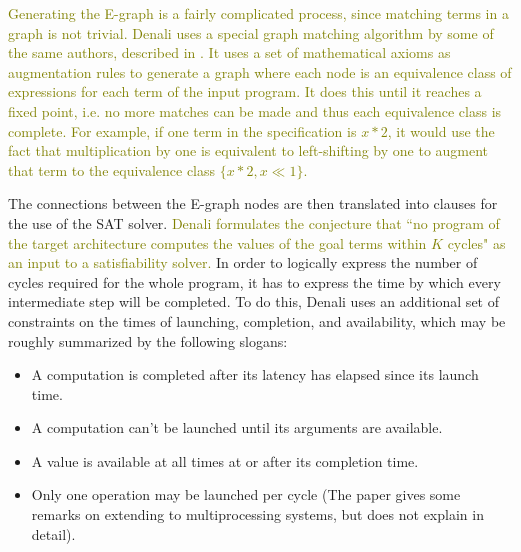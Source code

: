 \documentclass[12pt,twoside]{reedthesis}
\newcommand{\green}[1]{\textcolor{olive}{#1}}
\begin{document}
            \green{
            Generating the E-graph is a fairly complicated process, since matching terms in a graph is not trivial.
            Denali uses a special graph matching algorithm by some of the same authors, described in \cite{detlefs2005simplify}.
            It uses a set of mathematical axioms as augmentation rules to generate a graph where each node is an equivalence class of expressions for each term of the input program. It does this until it reaches a fixed point, i.e. no more matches can be made and thus each equivalence class is complete.
            For example, if one term in the specification is $x * 2$, it would use the fact that multiplication by one is equivalent to left-shifting by one to augment that term to the equivalence class $\{x * 2, x \ll 1\}$.
            }
            
                
            The connections between the E-graph nodes are then translated into clauses for the use of the SAT solver.
            \green{
            Denali formulates the conjecture that ``no program of the target architecture computes the values of the goal terms within $K$ cycles" as an input to a satisfiability solver.
            }
            In order to logically express the number of cycles required for the whole program, it has to express the time by which every intermediate step will be completed.
            To do this, Denali uses an additional set of constraints on the times of launching, completion, and availability, which may be roughly summarized by the following slogans:
            \begin{itemize}
                \item A computation is completed after its latency has elapsed since its launch time.
                \item A computation can't be launched until its arguments are available.
                \item A value is available at all times at or after its completion time.
                \item Only one operation may be launched per cycle (The paper gives some remarks on extending to multiprocessing systems, but does not explain in detail).
            \end{itemize}
            
\end{document}
